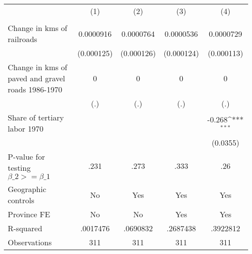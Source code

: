 {
\def\sym#1{\ifmmode^{#1}\else\(^{#1}\)\fi}
\begin{tabular}{l*{4}{c}}
\hline\hline
                &\multicolumn{1}{c}{(1)}&\multicolumn{1}{c}{(2)}&\multicolumn{1}{c}{(3)}&\multicolumn{1}{c}{(4)}\\
                &\multicolumn{1}{c}{}&\multicolumn{1}{c}{}&\multicolumn{1}{c}{}&\multicolumn{1}{c}{}\\
\hline
Change in kms of railroads&0.0000916         &0.0000764         &0.0000536         &0.0000729         \\
                &(0.000125)         &(0.000126)         &(0.000124)         &(0.000113)         \\
[1em]
Change in kms of paved and gravel roads 1986-1970&        0         &        0         &        0         &        0         \\
                &      (.)         &      (.)         &      (.)         &      (.)         \\
[1em]
Share of tertiary labor 1970&                  &                  &                  &   -0.268\sym{***}\\
                &                  &                  &                  & (0.0355)         \\
\hline
P-value for testing $\beta\_{2} >= \beta\_{1}$&     .231         &     .273         &     .333         &      .26         \\
Geographic controls&       No         &      Yes         &      Yes         &      Yes         \\
Province FE     &       No         &       No         &      Yes         &      Yes         \\
R-squared       & .0017476         & .0690832         & .2687438         & .3922812         \\
Observations    &      311         &      311         &      311         &      311         \\
\hline\hline
\end{tabular}
}
